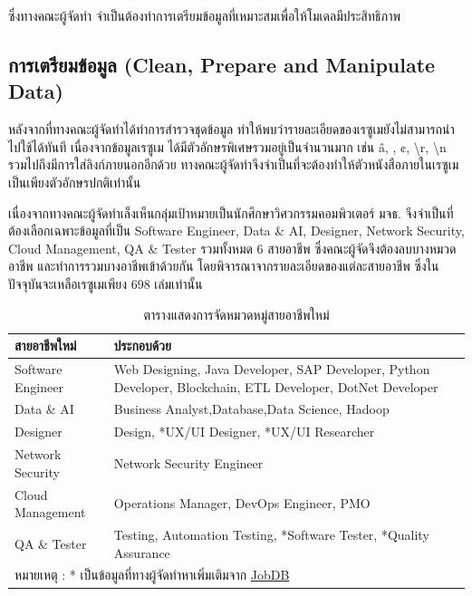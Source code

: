 \par ซึ่งทางคณะผู้จัดทำ จำเป็นต้องทำการเตรียมข้อมูลที่เหมาะสมเพื่อให้โมเดลมีประสิทธิภาพ

\subsection{การเตรียมข้อมูล (Clean, Prepare and Manipulate Data)}
\label{subsec:Data Preparation}
หลังจากที่ทางคณะผู้จัดทำได้ทำการสำรวจชุดข้อมูล ทำให้พบว่ารายละเอียดของเรซูเมยังไม่สามารถนำไปใช้ได้ทันที
เนื่องจากข้อมูลเรซูเม ได้มีตัวอักษรพิเศษรวมอยู่เป็นจำนวนมาก เช่น \^a, , ¢, \textbackslash r, \textbackslash n
รวมไปถึงมีการใส่ลิงก์ภายนอกอีกด้วย ทางคณะผู้จัดทำจึงจำเป็นที่จะต้องทำให้ตัวหนังสือภายในเรซูเม เป็นเพียงตัวอักษรปกติเท่านั้น
\par เนื่องจากทางคณะผู้จัดทำเล็งเห็นกลุ่มเป้าหมายเป็นนักศึกษาวิศวกรรมคอมพิวเตอร์ มจธ. จึงจำเป็นที่ต้องเลือกเฉพาะข้อมูลที่เป็น
Software Engineer, Data \& AI, Designer, Network Security, Cloud Management, QA \& Tester รวมทั้งหมด 6 สายอาชีพ
ซึ่งคณะผู้จัดจึงต้องลบบางหมวดอาชีพ และทำการรวมบางอาชีพเข้าด้วยกัน โดยพิจารณาจากรายละเอียดของแต่ละสายอาชีพ
ซึ่งในปัจจุบันจะเหลือเรซูเมเพียง 698 เล่มเท่านั้น

\begin{table}[H]
    \caption{ตารางแสดงการจัดหมวดหมู่สายอาชีพใหม่}
    \label{tab:grouping_data}
    \begin{tabularx}{\textwidth}{|l|X|} \hline
        สายอาชีพใหม่        & ประกอบด้วย                                                                                                   \\ \hline
        Software Engineer & Web Designing, Java Developer, SAP Developer, Python Developer, Blockchain, ETL Developer, DotNet Developer \\\hline
        Data \& AI        & Business Analyst,Database,Data Science, Hadoop                                                              \\\hline
        Designer          & Design, *UX/UI Designer, *UX/UI Researcher                                                                  \\\hline
        Network Security  & Network Security Engineer                                                                                   \\\hline
        Cloud Management  & Operations Manager, DevOps Engineer, PMO                                                                    \\\hline
        QA \& Tester      & Testing, Automation Testing, *Software Tester, *Quality Assurance                                           \\\hline
        \multicolumn{2}{l}{หมายเหตุ : * เป็นข้อมูลที่ทางผู้จัดทำหาเพิ่มเติมจาก \href{https://th.jobsdb.com/}{JobDB}}                                 \\ \hline\hline
    \end{tabularx}
\end{table}

